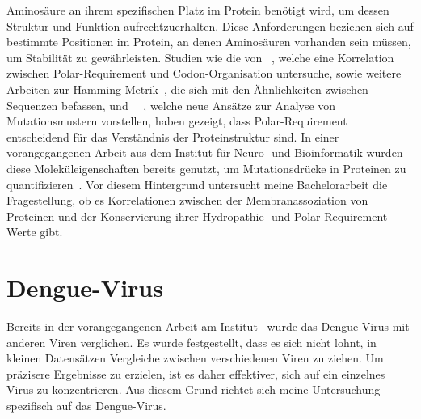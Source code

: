 \documentclass[german,version-2022-01]{uzl-thesis}
\begin{document}
Aminos\"aure an ihrem spezifischen Platz im Protein ben\"otigt wird, um dessen Struktur und Funktion aufrechtzuerhalten. Diese Anforderungen beziehen sich auf bestimmte Positionen im Protein, an denen Aminos\"auren vorhanden sein m\"ussen, um Stabilit\"at zu gew\"ahrleisten. Studien wie die von \citeauthor{mathew_physical_2008}~\cite{mathew_physical_2008}, welche eine Korrelation zwischen Polar-Requirement und Codon-Organisation untersuche, sowie weitere Arbeiten zur Hamming-Metrik~\cite{hammingMetric}, die sich mit den \"Ahnlichkeiten zwischen Sequenzen befassen, und \citeauthor{lenstra2015}~\citeyear{lenstra2015}~\cite{lenstra2015}, welche neue Ans\"atze zur Analyse von Mutationsmustern vorstellen, haben gezeigt, dass Polar-Requirement entscheidend f\"ur das Verst\"andnis der Proteinstruktur sind. In einer vorangegangenen Arbeit aus dem Institut f\"ur Neuro- und Bioinformatik wurden diese Molek\"uleigenschaften bereits genutzt, um Mutationsdr\"ucke in Proteinen zu quantifizieren~\cite{nina}. Vor diesem Hintergrund untersucht meine Bachelorarbeit die Fragestellung, ob es Korrelationen zwischen der Membranassoziation von Proteinen und der Konservierung ihrer Hydropathie- und Polar-Requirement-Werte gibt.

\section{Dengue-Virus}
Bereits in der vorangegangenen Arbeit am Institut~\cite{nina} wurde das Dengue-Virus mit anderen Viren verglichen. Es wurde festgestellt, dass es sich nicht lohnt, in kleinen Datens\"atzen Vergleiche zwischen verschiedenen Viren zu ziehen. Um pr\"azisere Ergebnisse zu erzielen, ist es daher effektiver, sich auf ein einzelnes Virus zu konzentrieren. Aus diesem Grund richtet sich meine Untersuchung spezifisch auf das Dengue-Virus.
\end{document}
